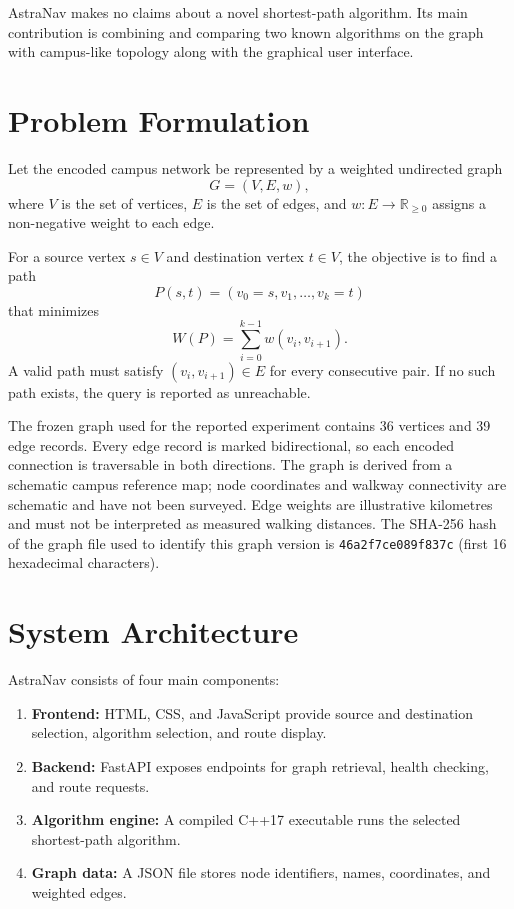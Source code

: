 \documentclass[conference]{IEEEtran}
\begin{document}
AstraNav makes no claims about a novel shortest-path algorithm. Its main contribution is combining and comparing two known algorithms on the graph with campus-like topology along with the graphical user interface.

\section{Problem Formulation}
Let the encoded campus network be represented by a weighted undirected graph
\begin{equation}
    G=(V,E,w),
\end{equation}
where $V$ is the set of vertices, $E$ is the set of edges, and
$w:E\rightarrow\mathbb{R}_{\geq 0}$ assigns a non-negative weight to each edge.

For a source vertex $s\in V$ and destination vertex $t\in V$, the objective is to find a path
\begin{equation}
    P(s,t)=(v_0=s,v_1,\ldots,v_k=t)
\end{equation}
that minimizes
\begin{equation}
    W(P)=\sum_{i=0}^{k-1}w(v_i,v_{i+1}).
\end{equation}
A valid path must satisfy $(v_i,v_{i+1})\in E$ for every consecutive pair. If no such path exists, the query is reported as unreachable.

The frozen graph used for the reported experiment contains 36 vertices and 39 edge records. Every edge record is marked bidirectional, so each encoded connection is traversable in both directions. The graph is derived from a schematic campus reference map; node coordinates and walkway connectivity are schematic and have not been surveyed. Edge weights are illustrative kilometres and must not be interpreted as measured walking distances. The SHA-256 hash of the graph file used to identify this graph version is \texttt{46a2f7ce089f837c} (first 16 hexadecimal characters).

\section{System Architecture}
AstraNav consists of four main components:
\begin{enumerate}
    \item \textbf{Frontend:} HTML, CSS, and JavaScript provide source and destination selection, algorithm selection, and route display.
    \item \textbf{Backend:} FastAPI exposes endpoints for graph retrieval, health checking, and route requests.
    \item \textbf{Algorithm engine:} A compiled C++17 executable runs the selected shortest-path algorithm.
    \item \textbf{Graph data:} A JSON file stores node identifiers, names, coordinates, and weighted edges.
\end{enumerate}
\end{document}
